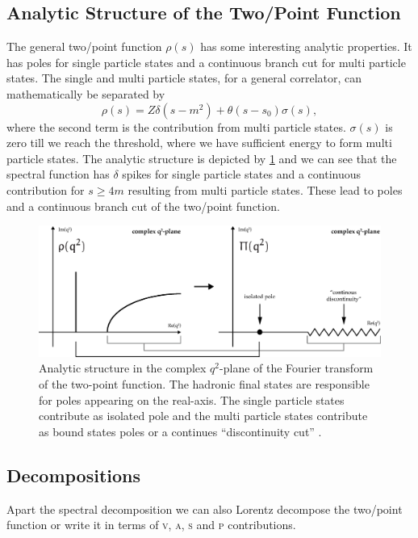 \documentclass[../../index.tex]{subfiles}
\begin{document}
\subsection{Analytic Structure of the Two\-/Point Function}
The general two\-/point function \(\rho(s)\) has some interesting analytic
properties. It has poles for single particle states and a continuous branch cut
for multi particle states. The single and multi particle states, for a general
correlator, can mathematically be separated by
\begin{equation}
  \rho(s) = Z \delta(s-m^2) + \theta(s-s_0)\sigma(s),
\end{equation}
where the second term is the contribution from multi particle states.
\(\sigma(s)\) is zero till we reach the threshold, where we have sufficient
energy to form multi particle states. The analytic structure is depicted by
\cref{fig:analyticStructureCorrelator} and we can see that the spectral function
has \(\delta\) spikes for single particle states and a continuous contribution
for \(s\geq 4m\) resulting from multi particle states. These lead to poles and a
continuous branch cut of the two\-/point function.
\begin{figure}
  \centering
  \includegraphics[width=\textwidth]{./images/analyticStructureCorrelator.eps}
  \caption{Analytic structure in the complex \(q^2\)-plane of the Fourier
    transform of the two-point function. The hadronic final states are
    responsible for poles appearing on the real-axis. The single particle states
    contribute as isolated pole and the multi particle states contribute as
    bound states poles or a continues ``discontinuity cut''
    \cite{Peskin1995,Zwicky2016}.}
  \label{fig:analyticStructureCorrelator}
\end{figure}

\subsection{Decompositions}
Apart the spectral decomposition we can also Lorentz decompose the two\-/point
function or write it in terms of \textsc{v}, \textsc{a}, \textsc{s} and
\textsc{p} contributions.
\end{document}
